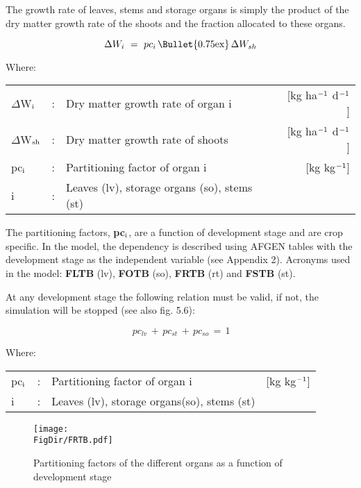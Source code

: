 The growth rate of leaves, stems and storage organs is simply the product of the dry
matter growth rate of the shoots and the fraction allocated to these organs.

\begin{equation}
\Delta W _{i} ~=~ pc _{i} \, {\rm \Bullet{0.75ex}}\, \Delta W _{sh} 
\end{equation}

Where:\\
\begin{tabularx}{\textwidth}{llXr}
$\Delta$W$_{{\rm i}}$ &:& Dry matter growth rate of organ i &
    [kg ha$^{{\rm -1}}$ d$^{{\rm -1}}$]\\
$\Delta$W$_{{\rm sh}}$ &:& Dry matter growth rate of shoots   &
    [kg ha$^{{\rm -1}}$ d$^{{\rm -1}}$]\\
pc$_{{\rm i}}$ &:& Partitioning factor of organ i    &
    [kg kg$^{{\rm -1}}$]\\
i &:& Leaves (lv), storage organs (so), stems (st)
\end{tabularx}

The partitioning factors, {\bf pc$_{{\rm i}}$}, are a function of development stage and are crop specific. In
the model, the dependency is described using AFGEN tables with the development stage
as the independent variable (see Appendix 2). Acronyms used in the model: {\bf FLTB} (lv),
{\bf FOTB} (so), {\bf FRTB} (rt) and {\bf FSTB} (st).

At any development stage the following relation must be valid, if not, the simulation will
be stopped (see also fig. 5.6):

\begin{equation}
\, pc _{lv} \, +\, pc _{st} \, +\, pc _{so} \, =\, 1
\end{equation}

Where:\\
\begin{tabularx}{\textwidth}{llXr}
pc$_{{\rm i}}$ &:& Partitioning factor of organ i   &
     [kg kg$^{{\rm -1}}$]\\
i &:& Leaves (lv), storage organs(so), stems (st)
\end{tabularx}

 
\begin{figure}[p]
\centering
\texttt{[image: \\FigDir/FRTB.pdf]}
\caption{Parti\-tioning factors of the differ\-ent organs as a function of de\-velop\-ment stage}
\label{fig:partitioning}
\end{figure}

